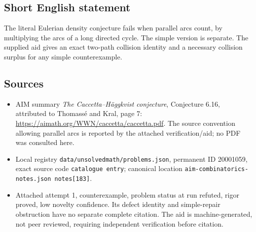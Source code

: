 \documentclass[11pt]{article}
\begin{document}
\subsection{Short English statement}
The literal Eulerian density conjecture fails when parallel arcs count, by multiplying the arcs of a long directed cycle. The simple version is separate. The supplied aid gives an exact two-path collision identity and a necessary collision surplus for any simple counterexample.
\subsection{Sources}
\begin{itemize}
\item AIM summary \emph{The Caccetta--H\"aggkvist conjecture}, Conjecture 6.16, attributed to Thomass\'e and Kral, page 7: \url{https://aimath.org/WWN/caccetta/caccetta.pdf}. The source convention allowing parallel arcs is reported by the attached verification/aid; no PDF was consulted here.
\item Local registry \texttt{data/unsolvedmath/problems.json}, permanent ID 20001059, exact source code \texttt{catalogue entry}; canonical location \texttt{aim-combinatorics-notes.json notes[183]}.
\item Attached attempt 1, counterexample, problem status at run refuted, rigor proved, low novelty confidence. Its defect identity and simple-repair obstruction have no separate complete citation. The aid is machine-generated, not peer reviewed, requiring independent verification before citation.
\end{itemize}
\end{document}
